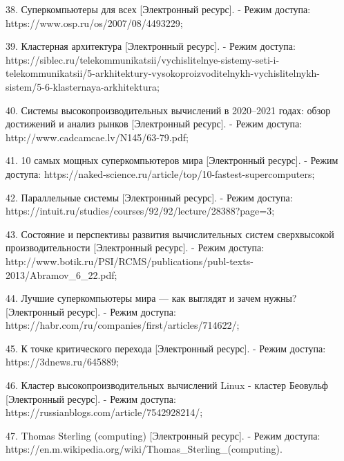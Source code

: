 \documentclass{article}
\begin{document}
38. Суперкомпьютеры для всех [Электронный ресурс].
   - Режим доступа: https://www.osp.ru/os/2007/08/4493229;

39. Кластерная архитектура [Электронный ресурс].
   - Режим доступа: https://siblec.ru/telekommunikatsii/vychislitelnye-sistemy-seti-i-telekommunikatsii/5-arkhitektury-vysokoproizvoditelnykh-vychislitelnykh-sistem/5-6-klasternaya-arkhitektura;

40. Системы высокопроизводительных вычислений в 2020–2021 годах: обзор достижений и анализ рынков [Электронный ресурс].
   - Режим доступа: http://www.cadcamcae.lv/N145/63-79.pdf;

41. 10 самых мощных суперкомпьютеров мира [Электронный ресурс].
   - Режим доступа: https://naked-science.ru/article/top/10-fastest-supercomputers;

42. Параллельные системы [Электронный ресурс].
   - Режим доступа: https://intuit.ru/studies/courses/92/92/lecture/28388?page=3;

43. Состояние и перспективы развития вычислительных систем сверхвысокой производительности [Электронный ресурс].
   - Режим доступа: http://www.botik.ru/PSI/RCMS/publications/publ-texts-2013/Abramov_6_22.pdf;

44. Лучшие суперкомпьютеры мира — как выглядят и зачем нужны? [Электронный ресурс].
   - Режим доступа: https://habr.com/ru/companies/first/articles/714622/;

45. К точке критического перехода [Электронный ресурс].
   - Режим доступа: https://3dnews.ru/645889;

46. Кластер высокопроизводительных вычислений Linux - кластер Беовульф [Электронный ресурс].
   - Режим доступа: https://russianblogs.com/article/7542928214/;

47. Thomas Sterling (computing) [Электронный ресурс].
   - Режим доступа: https://en.m.wikipedia.org/wiki/Thomas_Sterling_(computing).
\end{document}
